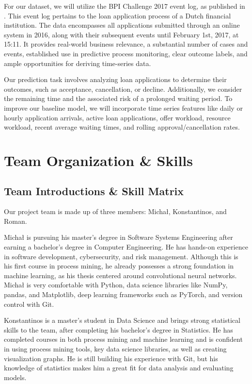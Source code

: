 \documentclass[runningheads]{llncs}
\begin{document}
For our dataset, we will utilize the BPI Challenge 2017 event log, as published in \cite{bpic2017}. This event log pertains to the loan application process of a Dutch financial institution. The data encompasses all applications submitted through an online system in 2016, along with their subsequent events until February 1st, 2017, at 15:11. It provides real-world business relevance, a substantial number of cases and events, established use in predictive process monitoring, clear outcome labels, and ample opportunities for deriving time-series data.

Our prediction task involves analyzing loan applications to determine their outcomes, such as acceptance, cancellation, or decline. Additionally, we consider the remaining time and the associated risk of a prolonged waiting period. To improve our baseline model, we will incorporate time series features like daily or hourly application arrivals, active loan applications, offer workload, resource workload, recent average waiting times, and rolling approval/cancellation rates.

\section{Team Organization \& Skills}

\subsection{Team Introductions \& Skill Matrix}
Our project team is made up of three members: Michał, Konstantinos, and Roman.

Michał is pursuing his master's degree in Software Systems Engineering after earning a bachelor's degree in Computer Engineering. He has hands-on experience in software development, cybersecurity, and risk management. Although this is his first course in process mining, he already possesses a strong foundation in machine learning, as his thesis centered around convolutional neural networks. Michał is very comfortable with Python, data science libraries like NumPy, pandas, and Matplotlib, deep learning frameworks such as PyTorch, and version control with Git.

Konstantinos is a master's student in Data Science and brings strong statistical skills to the team, after completing his bachelor's degree in Statistics. He has completed courses in both process mining and machine learning and is confident in using process mining tools, key data science libraries, as well as creating visualization graphs. He is still building his experience with Git, but his knowledge of statistics makes him a great fit for data analysis and evaluating models.
\end{document}
